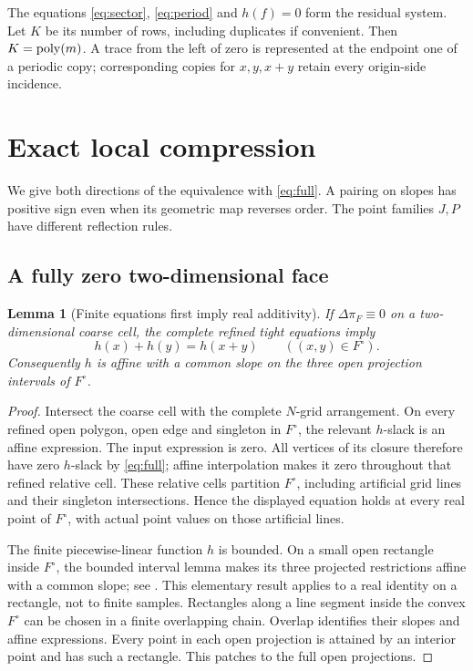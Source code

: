 \documentclass[11pt]{article}
\newtheorem{lemma}[theorem]{Lemma}
\newcommand{\Del}{\Delta}\newcommand{\rank}{\operatorname{rank}}
\begin{document}
The equations \eqref{eq:sector}, \eqref{eq:period} and $h(f)=0$ form the residual system. Let $K$ be its number of rows, including duplicates if convenient. Then $K=\operatorname{poly}(m)$. A trace from the left of zero is represented at the endpoint one of a periodic copy; corresponding copies for $x,y,x+y$ retain every origin-side incidence.

\section{Exact local compression}\label{sec:local}
We give both directions of the equivalence with \eqref{eq:full}. A pairing on slopes has positive sign even when its geometric map reverses order. The point families $J,P$ have different reflection rules.

\subsection{A fully zero two-dimensional face}
\begin{lemma}[Finite equations first imply real additivity]\label{lem:bridge}
If $\Del\pi_F\equiv0$ on a two-dimensional coarse cell, the complete refined tight equations imply
\[
 h(x)+h(y)=h(x+y)\qquad ((x,y)\in F^\circ).
\]
Consequently $h$ is affine with a common slope on the three open projection intervals of $F^\circ$.
\end{lemma}
\begin{proof}
Intersect the coarse cell with the complete $N$-grid arrangement. On every refined open polygon, open edge and singleton in $F^\circ$, the relevant $h$-slack is an affine expression. The input expression is zero. All vertices of its closure therefore have zero $h$-slack by \eqref{eq:full}; affine interpolation makes it zero throughout that refined relative cell. These relative cells partition $F^\circ$, including artificial grid lines and their singleton intersections. Hence the displayed equation holds at every real point of $F^\circ$, with actual point values on those artificial lines.

The finite piecewise-linear function $h$ is bounded. On a small open rectangle inside $F^\circ$, the bounded interval lemma makes its three projected restrictions affine with a common slope; see \cite[Lemma~1.7 and the patching in Lemma~4.1]{BHK}. This elementary result applies to a real identity on a rectangle, not to finite samples. Rectangles along a line segment inside the convex $F^\circ$ can be chosen in a finite overlapping chain. Overlap identifies their slopes and affine expressions. Every point in each open projection is attained by an interior point and has such a rectangle. This patches to the full open projections.
\end{proof}
\end{document}
